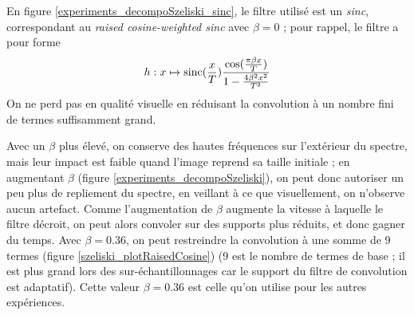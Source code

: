 	En figure \ref{experiments_decompoSzeliski_sinc}, le filtre utilisé est un \emph{sinc}, correspondant au \emph{raised cosine-weighted sinc} avec $\beta = 0$ ; pour rappel, le filtre a pour forme
	\[h : x \mapsto \operatorname{sinc}(\frac{x}{T})\frac{\cos(\frac{\pi\beta x}{T})}{1-\frac{4\beta^2x^2}{T^2}}\]
	On ne perd pas en qualité visuelle en réduisant la convolution à un nombre fini de termes suffisamment grand.
	
	Avec un $\beta$ plus élevé, on conserve des hautes fréquences sur l'extérieur du spectre, mais leur impact est faible quand l'image reprend sa taille initiale ; en augmentant $\beta$ (figure \ref{experiments_decompoSzeliski}), on peut donc autoriser un peu plus de repliement du spectre, en veillant à ce que visuellement, on n'observe aucun artefact. Comme l'augmentation de $\beta$ augmente la vitesse à laquelle le filtre décroit, on peut alors convoler sur des supports plus réduits, et donc gagner du temps. Avec $\beta = 0.36$, on peut restreindre la convolution à une somme de 9 termes (figure \ref{szeliski_plotRaisedCosine}) (9 est le nombre de termes de base ; il est plus grand lors des sur-échantillonnages car le support du filtre de convolution est adaptatif). Cette valeur $\beta = 0.36$ est celle qu'on utilise pour les autres expériences.
 
